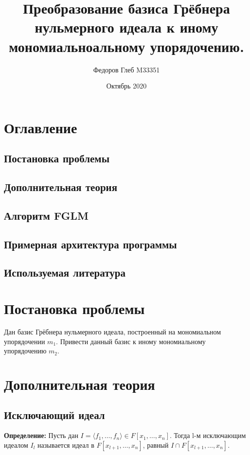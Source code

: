 \documentclass{article}
\title{Преобразование базиса Грёбнера нульмерного идеала к иному мономиальноальному упорядочению.}
\author{Федоров Глеб M33351}
\date{Октябрь 2020}
\begin{document}

\begin{titlepage}
        \maketitle
\end{titlepage}
    
\section{Оглавление}
    \subsection{Постановка проблемы}
    \subsection{Дополнительная теория}
    \subsection{Алгоритм FGLM}
    \subsection{Примерная архитектура программы}
    \subsection{Используемая литература}
    \newpage
\section{Постановка проблемы}
    Дан базис Грёбнера нульмерного идеала, построенный на мономиальном упорядочении $m_1$.
    Привести данный базис к иному мономиальному упорядочению $m_2$.
    \newpage
\section{Дополнительная теория} 
    \subsection{Исключающий идеал}

    \textbf{Определение:} Пусть дан $I = \langle f_1, \ldots, f_n \rangle  \in F[x_1,\ldots,x_n]$. Тогда l-м исключающим идеалом $I_l$ называется 
    идеал в $F[x_{l+1},\ldots, x_n]$, равный $I \cap F[x_{l+1},\ldots, x_n]$.
\end{document}
